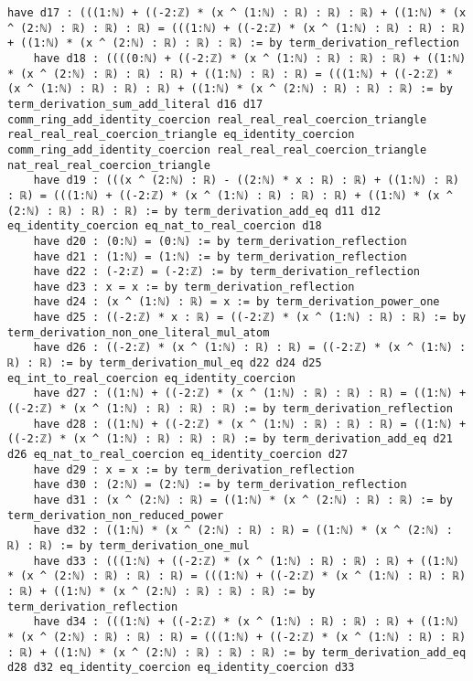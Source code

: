 \documentclass{article}
\begin{document}
\begin{tcolorbox}[colback=white!10, width=\linewidth]
\begin{lstlisting}[language=Lean4]
    have d17 : (((1:ℕ) + ((-2:ℤ) * (x ^ (1:ℕ) : ℝ) : ℝ) : ℝ) + ((1:ℕ) * (x ^ (2:ℕ) : ℝ) : ℝ) : ℝ) = (((1:ℕ) + ((-2:ℤ) * (x ^ (1:ℕ) : ℝ) : ℝ) : ℝ) + ((1:ℕ) * (x ^ (2:ℕ) : ℝ) : ℝ) : ℝ) := by term_derivation_reflection
    have d18 : ((((0:ℕ) + ((-2:ℤ) * (x ^ (1:ℕ) : ℝ) : ℝ) : ℝ) + ((1:ℕ) * (x ^ (2:ℕ) : ℝ) : ℝ) : ℝ) + ((1:ℕ) : ℝ) : ℝ) = (((1:ℕ) + ((-2:ℤ) * (x ^ (1:ℕ) : ℝ) : ℝ) : ℝ) + ((1:ℕ) * (x ^ (2:ℕ) : ℝ) : ℝ) : ℝ) := by term_derivation_sum_add_literal d16 d17 comm_ring_add_identity_coercion real_real_real_coercion_triangle real_real_real_coercion_triangle eq_identity_coercion comm_ring_add_identity_coercion real_real_real_coercion_triangle nat_real_real_coercion_triangle
    have d19 : (((x ^ (2:ℕ) : ℝ) - ((2:ℕ) * x : ℝ) : ℝ) + ((1:ℕ) : ℝ) : ℝ) = (((1:ℕ) + ((-2:ℤ) * (x ^ (1:ℕ) : ℝ) : ℝ) : ℝ) + ((1:ℕ) * (x ^ (2:ℕ) : ℝ) : ℝ) : ℝ) := by term_derivation_add_eq d11 d12 eq_identity_coercion eq_nat_to_real_coercion d18
    have d20 : (0:ℕ) = (0:ℕ) := by term_derivation_reflection
    have d21 : (1:ℕ) = (1:ℕ) := by term_derivation_reflection
    have d22 : (-2:ℤ) = (-2:ℤ) := by term_derivation_reflection
    have d23 : x = x := by term_derivation_reflection
    have d24 : (x ^ (1:ℕ) : ℝ) = x := by term_derivation_power_one
    have d25 : ((-2:ℤ) * x : ℝ) = ((-2:ℤ) * (x ^ (1:ℕ) : ℝ) : ℝ) := by term_derivation_non_one_literal_mul_atom
    have d26 : ((-2:ℤ) * (x ^ (1:ℕ) : ℝ) : ℝ) = ((-2:ℤ) * (x ^ (1:ℕ) : ℝ) : ℝ) := by term_derivation_mul_eq d22 d24 d25 eq_int_to_real_coercion eq_identity_coercion
    have d27 : ((1:ℕ) + ((-2:ℤ) * (x ^ (1:ℕ) : ℝ) : ℝ) : ℝ) = ((1:ℕ) + ((-2:ℤ) * (x ^ (1:ℕ) : ℝ) : ℝ) : ℝ) := by term_derivation_reflection
    have d28 : ((1:ℕ) + ((-2:ℤ) * (x ^ (1:ℕ) : ℝ) : ℝ) : ℝ) = ((1:ℕ) + ((-2:ℤ) * (x ^ (1:ℕ) : ℝ) : ℝ) : ℝ) := by term_derivation_add_eq d21 d26 eq_nat_to_real_coercion eq_identity_coercion d27
    have d29 : x = x := by term_derivation_reflection
    have d30 : (2:ℕ) = (2:ℕ) := by term_derivation_reflection
    have d31 : (x ^ (2:ℕ) : ℝ) = ((1:ℕ) * (x ^ (2:ℕ) : ℝ) : ℝ) := by term_derivation_non_reduced_power
    have d32 : ((1:ℕ) * (x ^ (2:ℕ) : ℝ) : ℝ) = ((1:ℕ) * (x ^ (2:ℕ) : ℝ) : ℝ) := by term_derivation_one_mul
    have d33 : (((1:ℕ) + ((-2:ℤ) * (x ^ (1:ℕ) : ℝ) : ℝ) : ℝ) + ((1:ℕ) * (x ^ (2:ℕ) : ℝ) : ℝ) : ℝ) = (((1:ℕ) + ((-2:ℤ) * (x ^ (1:ℕ) : ℝ) : ℝ) : ℝ) + ((1:ℕ) * (x ^ (2:ℕ) : ℝ) : ℝ) : ℝ) := by term_derivation_reflection
    have d34 : (((1:ℕ) + ((-2:ℤ) * (x ^ (1:ℕ) : ℝ) : ℝ) : ℝ) + ((1:ℕ) * (x ^ (2:ℕ) : ℝ) : ℝ) : ℝ) = (((1:ℕ) + ((-2:ℤ) * (x ^ (1:ℕ) : ℝ) : ℝ) : ℝ) + ((1:ℕ) * (x ^ (2:ℕ) : ℝ) : ℝ) : ℝ) := by term_derivation_add_eq d28 d32 eq_identity_coercion eq_identity_coercion d33

\end{lstlisting}
\end{tcolorbox}
\end{document}
